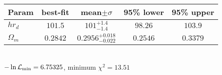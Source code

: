\begin{tabular}{|l|c|c|c|c|} 
 \hline 
Param & best-fit & mean$\pm\sigma$ & 95\% lower & 95\% upper \\ \hline 
$h r_{{d} }$ &$101.5$ & $101_{-1.4}^{+1.4}$ & $98.26$ & $103.9$ \\ 
$\Omega_{m }$ &$0.2842$ & $0.2956_{-0.022}^{+0.018}$ & $0.2546$ & $0.3379$ \\ 
\hline 
 \end{tabular} \\ 
$-\ln{\cal L}_\mathrm{min} =6.75325$, minimum $\chi^2=13.51$ \\ 
